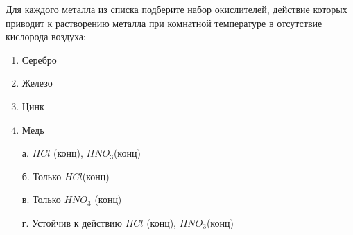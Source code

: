 
Для каждого металла из списка подберите набор окислителей, действие которых
приводит к растворению металла при комнатной температуре в отсутствие кислорода
воздуха:

\begin{multicols}{2}
\begin{enumerate}
    \item Серебро 
    \item Железо 
    \item Цинк 
    \item Медь
\end{enumerate}

\begin{enumerate}
    \item[а.] $HCl$ (конц),   $HNO_3$(конц)
    \item[б.] Только $HCl$(конц)
    \item[в.] Только $HNO_3$ (конц)
    \item[г.] Устойчив к действию  $HCl$ (конц),   $HNO_3$(конц)
\end{enumerate}
\end{multicols}




